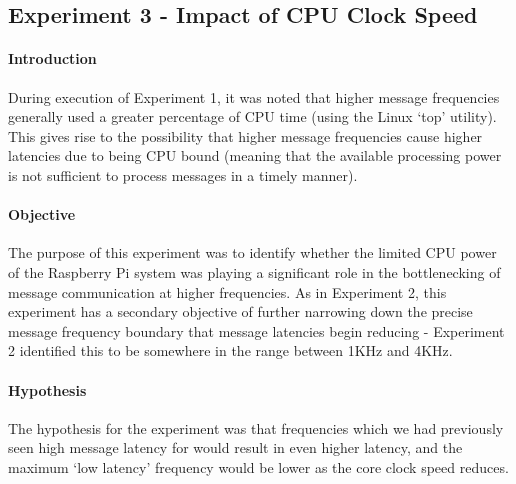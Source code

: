 \documentclass[../dissertation.tex]{subfiles}
\begin{document}
\subsection{Experiment 3 - Impact of CPU Clock Speed}
\label{experiment3-cpu-speed}

\paragraph{Introduction} During execution of Experiment 1, it was noted that higher message frequencies generally used a greater percentage of CPU time (using the Linux `top' utility). This gives rise to the possibility that higher message frequencies cause higher latencies due to being CPU bound (meaning that the available processing power is not sufficient to process messages in a timely manner).

\paragraph{Objective} The purpose of this experiment was to identify whether the limited CPU power of the Raspberry Pi system was playing a significant role in the bottlenecking of message communication at higher frequencies. As in Experiment 2, this experiment has a secondary objective of further narrowing down the precise message frequency boundary that message latencies begin reducing - Experiment 2 identified this to be somewhere in the range between 1KHz and 4KHz.

\paragraph{Hypothesis} The hypothesis for the experiment was that frequencies which we had previously seen high message latency for would result in even higher latency, and the maximum `low latency' frequency would be lower as the core clock speed reduces.
\end{document}
